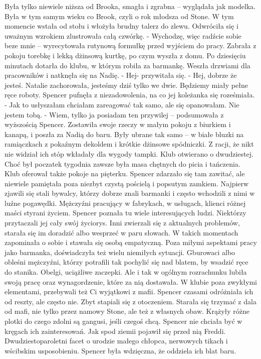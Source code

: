 \documentclass[12pt,a4paper]{book}
\begin{document}
Była tylko niewiele niższa od Brooka, smagła i zgrabna – wyglądała jak modelka. Była w tym samym wieku co Brook, czyli o rok młodsza od Stone. 
W tym momencie wstała od stołu i włożyła brudny talerz do zlewu. Odwróciła się i uważnym wzrokiem zlustrowała całą czwórkę. 
- Wychodzę, więc radźcie sobie beze mnie – wyrecytowała rutynową formułkę przed wyjściem do pracy. 
Zabrała z pokoju torebkę i lekką dżinsową kurtkę, po czym wyszła z domu. Po dziesięciu minutach dotarła do klubu, w którym robiła za barmankę. Weszła drzwiami dla pracowników i natknęła się na Nadię. 
- Hej- przywitała się. 
- Hej, dobrze że jesteś. Natalie zachorowała, jesteśmy dziś tylko we dwie. Będziemy miały pełne ręce roboty. 
Spencer pufnęła z niezadowolenia, na co jej koleżanka się roześmiała. 
- Jak to usłyszałam chciałam zareagować tak samo, ale się opanowałam.  Nie jestem tobą. 
- Wiem, tylko ja posiadam ten przywilej – podsumowała z wyższością Spencer.
Zostawiła swoje rzeczy w małym pokoju z biurkiem i kanapą, i poszła za Nadią do baru. Były ubrane tak samo – w białe bluzki na ramiączkach z pokaźnym dekoldem i krótkie dżinsowe spódniczki. Z racji, że nikt nie widział ich stóp wkładały dla wygody tampki. 
Klub otwierano o dwudziestej. Choć był poczatek tygodnia zawsze była masa chętnych do picia i tańczenia. Klub oferował także pokoje na pięterku. Spencer zdarzało się tam zawitać, ale niewiele pamiętała poza niezbyt czystą pościelą i popsutym zamkiem. 
Najpierw zjawili się stali bywalcy, którzy dobrze znali barmanki i często wchodzili z nimi w luźne pogawędki. Mężczyźni pracujący w fabrykach, w usługach, klienci różnej maści styrani życiem. Spencer poznała tu wiele interesujących ludzi. Niektórzy przytaczali jej cały swój życiorys. Inni zwierzali się z aktualnych problemów, starała się im doradzić albo wesprzeć w paru słowach. W takich momentach zapominała o sobie i stawała się osobą empatyczną. Poza miłymi aspektami pracy jako barmanka, doświadczyła też wielu niemiłych sytuacji. Gburowaci albo obleśni mężczyźni, którzy potrafili tak pochylić się nad blatem, by wsadzić ręce do stanika. Obelgi, uciążliwe zaczepki. Ale i tak w ogólnym rozrachunku lubiła swoją pracę oraz wynagordzenie, które za nią dostawała. 
W klubie poza zwykłymi elementami, przebywali też Ci wyjątkowi z mafii. Spencer czasami odróżniała ich od reszty, ale często nie. Zbyt stapiali się z otoczeniem. Starała się trzymać z dala od mafi, nie tylko przez namowy Stone, ale też z własnych obaw. Krążyły różne plotki do czego zdolni są gangusi, jeśli czegoś chcą. Spencer nie chciała być w kręgach ich zainteresowań. 
Jak spod ziemii pojawił się przed nią Freddi. Dwudziestoparoletni facet o urodzie małego chłopca, nerwowych tikach i wścibskim usposobieniu. Spencer była wdzięczna, że oddziela ich blat baru. 
\end{document}
